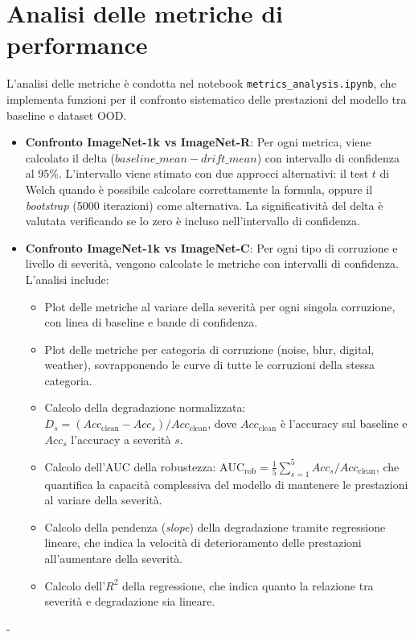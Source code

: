 \section{Analisi delle metriche di performance}
L'analisi delle metriche è condotta nel notebook \texttt{metrics\_analysis.ipynb}, che implementa funzioni per il confronto sistematico delle prestazioni del modello tra baseline e dataset OOD.
\begin{itemize}
	\item \textbf{Confronto ImageNet-1k vs ImageNet-R}: Per ogni metrica, viene calcolato il delta ($baseline\_mean - drift\_mean$) con intervallo di confidenza al 95\%. L'intervallo viene stimato con due approcci alternativi: il test $t$ di Welch quando è possibile calcolare correttamente la formula, oppure il \emph{bootstrap} (5000 iterazioni) come alternativa. La significatività del delta è valutata verificando se lo zero è incluso nell'intervallo di confidenza.
	\item \textbf{Confronto ImageNet-1k vs ImageNet-C}: Per ogni tipo di corruzione e livello di severità, vengono calcolate le metriche con intervalli di confidenza. L'analisi include:
	\begin{itemize}
		\item Plot delle metriche al variare della severità per ogni singola corruzione, con linea di baseline e bande di confidenza.
		\item Plot delle metriche per categoria di corruzione (noise, blur, digital, weather), sovrapponendo le curve di tutte le corruzioni della stessa categoria.
		\item Calcolo della degradazione normalizzata: $D_s = (Acc_{\text{clean}} - Acc_s) / Acc_{\text{clean}}$, dove $Acc_{\text{clean}}$ è l'accuracy sul baseline e $Acc_s$ l'accuracy a severità $s$.
		\item Calcolo dell'AUC della robustezza: $\text{AUC}_{\text{rob}} = \frac{1}{5} \sum_{s=1}^{5} Acc_s / Acc_{\text{clean}}$, che quantifica la capacità complessiva del modello di mantenere le prestazioni al variare della severità.
		\item Calcolo della pendenza (\textit{slope}) della degradazione tramite regressione lineare, che indica la velocità di deterioramento delle prestazioni all'aumentare della severità.
		\item Calcolo dell'$R^2$ della regressione, che indica quanto la relazione tra severità e degradazione sia lineare.
	\end{itemize}
\end{itemize}-